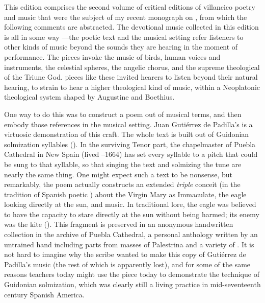 This edition comprises the second volume of critical editions of villancico
poetry and music that were the subject of my recent monograph on , from which the following comments are
abstracted.%
    \Autocites
    {Cashner:WLSCM32}
    {Cashner:HearingFaith}
The devotional music collected in this edition is all in some way
---the poetic text and the musical setting refer
listeners to other kinds of music beyond the sounds they are hearing in the
moment of performance.
The pieces invoke the music of birds, human voices and instruments, the
celestial spheres, the angelic chorus, and the supreme theological
 of the Triune God.
 pieces like these invited hearers to listen beyond their
natural hearing, to strain to hear a higher theological kind of music, within
a Neoplatonic theological system shaped by Augustine and Boethius.

One way to do this was to construct a poem out of musical terms, and then
embody those references in the musical setting.
Juan Gutiérrez de Padilla's  is a
virtuosic demonstration of this craft.
The whole text is built out of Guidonian solmization syllables ().
In the surviving Tenor part, the chapelmaster of Puebla Cathedral in New Spain
(lived --1664) has set every syllable to a pitch that could be
sung to that syllable, so that singing the text and solmizing the tune are
nearly the same thing.
One might expect such a text to be nonsense, but remarkably, the poem actually
constructs an extended \emph{triple} conceit (in the tradition of Spanish poetic
) about the Virgin Mary as Immaculate, the eagle looking 
directly at the sun, and music.
In traditional lore, the eagle was believed to have the capacity to stare
directly at the sun without being harmed; its enemy was the kite
().%
    \Autocite[]{Covarrubias:Tesoro}
This fragment is preserved in an anonymous handwritten collection in the
archive of Puebla Cathedral, a personal anthology written by an untrained hand
including parts from masses of Palestrina and a variety of .
It is not hard to imagine why the scribe wanted to make this copy of Gutiérrez
de Padilla's music (the rest of which is apparently lost), and for some of the
same reasons teachers today might use the piece today to demonstrate the
technique of Guidonian solmization, which was clearly still a living practice
in mid-seventeenth century Spanish America.

